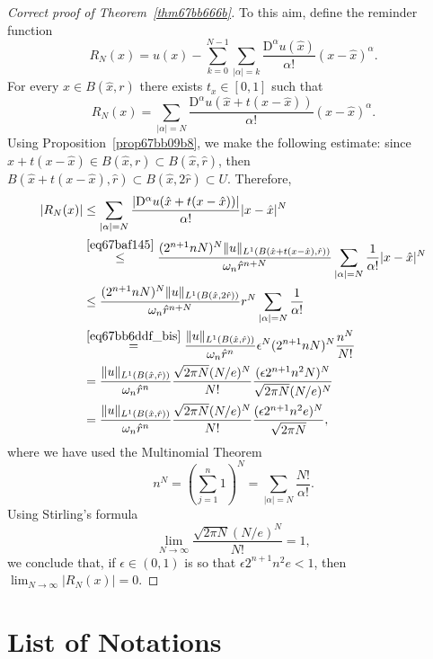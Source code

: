 \documentclass[a4paper,9pt]{amsart}
\newcommand{\Diff}{\mathrm{D}}
\theoremstyle{plain}
\theoremstyle{definition}
\theoremstyle{remark}
\begin{document}
\begin{proof}[Correct proof of Theorem~\ref{thm67bb666b}]
	To this aim, define the reminder function
	\[
	R_N(x) = u(x) - \sum_{k=0}^{N-1} \sum_{|\alpha|=k} \frac{\Diff^\alpha u(\hat x)}{\alpha!} (x-\hat x)^\alpha .
	\]
	For every $x\in B(\hat x,r)$ there exists $t_x\in[0,1]$ such that
	\[
	R_N(x) = \sum_{|\alpha|=N} \frac{\Diff^\alpha u(\hat x+t(x-\hat x))}{\alpha!} (x-\hat x)^\alpha .
	\]
	Using Proposition~\ref{prop67bb09b8}, we make the following estimate:
	since $\hat x+t(x-\hat x)\in B(\hat x,r) \subset B(\hat x,\hat r)$, then
	$B(\hat x+t(x-\hat x) , \hat r) \subset B(\hat x,2 \hat r) \subset U$.
	Therefore, 
	\begin{align*}
		|R_N(x)|
		&\le \sum_{|\alpha|=N} \frac{|\Diff^\alpha u(\hat x+t(x-\hat x))|}{\alpha!} |x-\hat x|^N \\
		&\overset{\eqref{eq67baf145}}\le  \frac{(2^{n+1}nN)^N \|u\|_{L^1(B(\hat x+t(x-\hat x),\hat r))}}{\omega_n \hat r^{n+N} }  \sum_{|\alpha|=N}\frac1{\alpha!} |x-\hat x|^N \\
		&\le  \frac{(2^{n+1}nN)^N \|u\|_{L^1(B(\hat x,2\hat r))}}{\omega_n \hat r^{n+N} }  r^N \sum_{|\alpha|=N}\frac1{\alpha!}\\
		&\overset{\eqref{eq67bb6ddf_bis}}= \frac{\|u\|_{L^1(B(\hat x, \hat r))}}{\omega_n \hat r^n} \epsilon^N (2^{n+1}nN)^N \frac{n^N}{N!} \\
		&= \frac{\|u\|_{L^1(B(\hat x, \hat r))} }{ \omega_n \hat r^n } \frac{\sqrt{2\pi N} (N/e)^N }{N!} 
			\frac{(\epsilon 2^{n+1}n^2N)^{N}}{\sqrt{2\pi N} (N/e)^N } \\
		&= \frac{\|u\|_{L^1(B(\hat x, \hat r))} }{ \omega_n \hat r^n } \frac{\sqrt{2\pi N} (N/e)^N }{N!} 
			\frac{(\epsilon 2^{n+1}n^2e)^{N}}{\sqrt{2\pi N} } ,\\
	\end{align*}
	where we have used the Multinomial Theorem
	\begin{equation}\label{eq67bb6ddf_bis}
		n^N = (\sum_{j=1}^n 1)^N = \sum_{|\alpha|=N} \frac{N!}{\alpha!} .
	\end{equation}
	Using Stirling's formula
	\begin{equation}\label{eq67bb6e37}
		\lim_{N\to\infty} \frac{\sqrt{2\pi N} (N/e)^N }{N!}  = 1 ,
	\end{equation}
	we conclude that, if $\epsilon\in(0,1)$ is so that $\epsilon 2^{n+1}n^2e<1$, then $\lim_{N\to\infty}|R_N(x)|=0$.
\end{proof}


\section{List of Notations}
\end{document}
